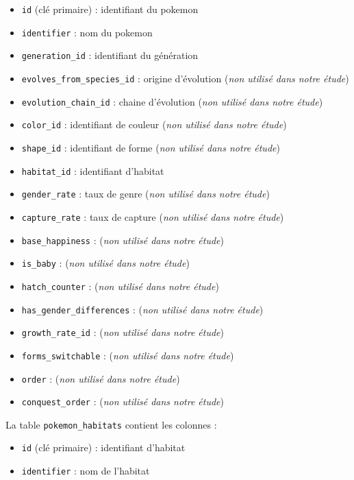 \begin{itemize}[itemsep=0mm]
	\item \texttt{id} (clé primaire) : identifiant du pokemon 
	\item \texttt{identifier} : nom du pokemon
	\item \texttt{generation\_id} : identifiant du génération 
	\item \texttt{evolves\_from\_species\_id} : origine d'évolution (\emph{non utilisé dans notre étude})
	\item \texttt{evolution\_chain\_id} : chaine d'évolution (\emph{non utilisé dans notre étude})
	\item \texttt{color\_id} : identifiant de couleur (\emph{non utilisé dans notre étude})
	\item \texttt{shape\_id} : identifiant de forme (\emph{non utilisé dans notre étude})
	\item \texttt{habitat\_id} : identifiant d'habitat
	\item \texttt{gender\_rate} : taux de genre (\emph{non utilisé dans notre étude})
	\item \texttt{capture\_rate} : taux de capture (\emph{non utilisé dans notre étude})
	\item \texttt{base\_happiness} : (\emph{non utilisé dans notre étude})
	\item \texttt{is\_baby} : (\emph{non utilisé dans notre étude})
	\item \texttt{hatch\_counter} : (\emph{non utilisé dans notre étude})
	\item \texttt{has\_gender\_differences} : (\emph{non utilisé dans notre étude})
	\item \texttt{growth\_rate\_id} : (\emph{non utilisé dans notre étude})
	\item \texttt{forms\_switchable} : (\emph{non utilisé dans notre étude})
	\item \texttt{order} : (\emph{non utilisé dans notre étude})
	\item \texttt{conquest\_order} : (\emph{non utilisé dans notre étude})
\end{itemize}


La table \texttt{pokemon\_habitats} contient les colonnes :

\begin{itemize}[itemsep=0mm]
	\item \texttt{id} (clé primaire) : identifiant d'habitat
	\item \texttt{identifier} : nom de l'habitat
\end{itemize}

